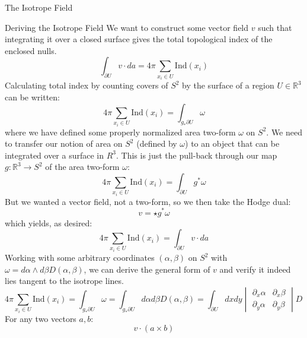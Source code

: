 \documentclass[final]{beamer}
\newlength{\onecolwid}
\begin{document}
\begin{frame}[t]
\begin{columns}[t]
\begin{column}{\onecolwid}
\begin{block}{\huge{The Isotrope Field}}
\begin{block}{Deriving the Isotrope Field}
  We want to construct some vector field $v$ such that integrating it over a closed surface
  gives the total topological index of the enclosed nulls.
  {\large
  \begin{equation}
    \boxed{\int_{\partial U}v\cdot da=4\pi\sum_{x_i\in U}\mathrm{Ind}(x_i)}
  \end{equation}
  }
  Calculating total index by counting covers of $S^2$ by the surface of a region $U\in\mathbb{R}^3$
  can be written:
  \begin{equation}
    4\pi\sum_{x_i\in U}\mathrm{Ind}(x_i)=\int_{g_*\partial U}\omega
  \end{equation}
  where we have defined some properly normalized area two-form $\omega$ on $S^2$.
  We need to transfer our notion of area on $S^2$ (defined by $\omega$)
  to an object that can be integrated over a surface in $R^3$.
  This is just the pull-back through our map $g:\mathbb{R}^3\rightarrow S^2$
  of the area two-form $\omega$:
  \begin{equation}
    4\pi\sum_{x_i\in U}\mathrm{Ind}(x_i)=\int_{\partial U}g^*\omega
  \end{equation}
  But we wanted a vector field, not a two-form, so we then take the Hodge dual:
  \begin{equation}
    v=\star g^*\omega
  \end{equation}
  which yields, as desired:
  \begin{equation}
    4\pi\sum_{x_i\in U}\mathrm{Ind}(x_i)=\int_{\partial U}v\cdot da
  \end{equation}
  Working with some arbitrary coordinates $(\alpha,\beta)$
  on $S^2$ with $\omega=d\alpha\wedge d\beta D(\alpha,\beta)$,
  we can derive the general form of $v$
  and verify it indeed lies tangent to the isotrope lines.
  \begin{equation}
    4\pi\sum_{x_i\in U}\mathrm{Ind}(x_i)
    =\int_{g_*\partial U}\omega
    =\int_{g_*\partial U}d\alpha d\beta D(\alpha,\beta)
    =\int_{\partial U}dxdy
    \begin{vmatrix}
      \partial_x\alpha & \partial_x \beta \\
      \partial_y\alpha & \partial_y \beta
    \end{vmatrix}
    D(\alpha,\beta)
    =\int_{\partial U}g^*\omega
    =\int_{\partial U}v\cdot da
  \end{equation}
  For any two vectors $a,b$:
  \begin{equation}
    v\cdot(a\times b)

\end{equation}
\end{block}
\end{block}
\end{column}
\end{columns}
\end{frame}
\end{document}

